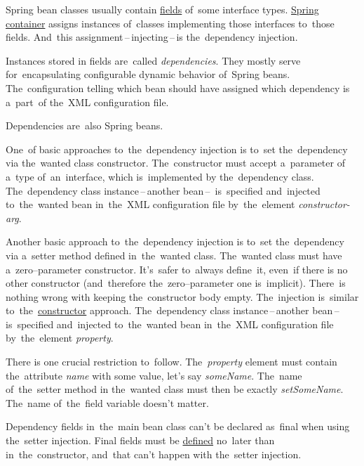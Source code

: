 \label{dependencyinjection}
Spring bean classes usually contain \hyperref[variablefieldproperty]{fields} of~some interface types. \hyperref[springcontainrer]{Spring container} assigns instances of~classes implementing those interfaces to~those fields. And~this assignment\,--\,injecting\,--\,is the~dependency injection.

Instances stored in fields are~called \textit{dependencies}. They mostly serve for~encapsulating configurable dynamic behavior of~Spring beans. The~configuration telling which bean should have assigned which dependency is a~part~of the~XML configuration file.

\note Dependencies are~also Spring beans.

\label{constructorinjection}
One~of basic approaches to~the~dependency injection is to~set the~dependency via the~wanted class constructor. The~constructor must accept a~parameter of a~type of~an~interface, which is~implemented by the~dependency class. The~dependency class instance\,--\,another bean\,--\, is~specified and~injected to~the~wanted bean in~the~XML configuration file by~the~element \textit{constructor-arg}.

\label{setterinjection}
Another basic approach to~the~dependency injection is to~set the~dependency via a~setter method defined in~the~wanted class. The~wanted class must have a~zero--parameter constructor. It's~safer to~always define~it, even~if there is no other constructor (and~therefore the~zero--parameter one is~implicit). There~is nothing wrong with keeping the~constructor body empty. The~injection is~similar to~the~\hyperref[constructorinjection]{constructor} approach. The~dependency class instance\,--\,another bean\,--\, is~specified and~injected to~the~wanted bean in~the~XML configuration file by~the~element \textit{property}.

\warning There is one crucial restriction to~follow. The~\textit{property} element must contain the~attribute \textit{name} with some value, let's say \textit{someName}. The~name of~the~setter method in the~wanted class must then be exactly \textit{setSomeName}. The~name of~the~field variable doesn't matter.

\warning Dependency fields in~the~main bean class can't be declared as~final when using the~setter injection. Final fields must be \hyperref[declarationdefinition]{defined} no~later than in~the~constructor, and~that can't happen with the~setter injection.

